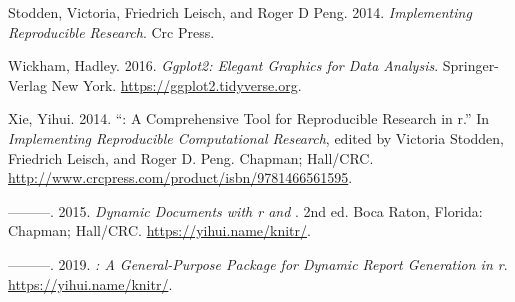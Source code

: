 \begin{CSLReferences}{1}{0}
\leavevmode{}%
Stodden, Victoria, Friedrich Leisch, and Roger D Peng. 2014. \emph{Implementing Reproducible Research}. Crc Press.

\leavevmode{}%
Wickham, Hadley. 2016. \emph{Ggplot2: Elegant Graphics for Data Analysis}. Springer-Verlag New York. \url{https://ggplot2.tidyverse.org}.

\leavevmode{}%
Xie, Yihui. 2014. {``: A Comprehensive Tool for Reproducible Research in r.''} In \emph{Implementing Reproducible Computational Research}, edited by Victoria Stodden, Friedrich Leisch, and Roger D. Peng. Chapman; Hall/CRC. \url{http://www.crcpress.com/product/isbn/9781466561595}.

\leavevmode{}%
---------. 2015. \emph{Dynamic Documents with r and }. 2nd ed. Boca Raton, Florida: Chapman; Hall/CRC. \url{https://yihui.name/knitr/}.

\leavevmode{}%
---------. 2019. \emph{: A General-Purpose Package for Dynamic Report Generation in r}. \url{https://yihui.name/knitr/}.

\end{CSLReferences}


\address{%
Sagiru Mati\\
Near East University\\%
\textsuperscript{1}Operational Research Center in Healthcare\\ Near East University, Nicosia, North Cyprus\\ \textsuperscript{2}Department of Economics\\ Yusuf Maitama Sule University, Nigeria\\ \url{https://www.smati.com.ng}\\ \emph{ORCiD: \href{https://orcid.org/0000-0003-1413-3974}{0000-0003-1413-3974}}\\ \href{mailto:sagirumati@gmail.com}{\texttt{sagirumati@gmail.com}}\\
%
%
%
%
}

\address{%
Irfan Civcir\\
Ankara University\\%
Department of Economics\\ Ankara, Turkey\\ \url{http://cv.ankara.edu.tr/kisi.php?id=civcir@politics.ankara.edu.tr&deger=2}\\ \emph{ORCiD: \href{https://orcid.org/0000-0002-2557-2625}{0000-0002-2557-2625}}\\ \href{mailto:civcir@politics.ankara.edu.tr}{\texttt{civcir@politics.ankara.edu.tr}}\\
%
%
%
%
}

